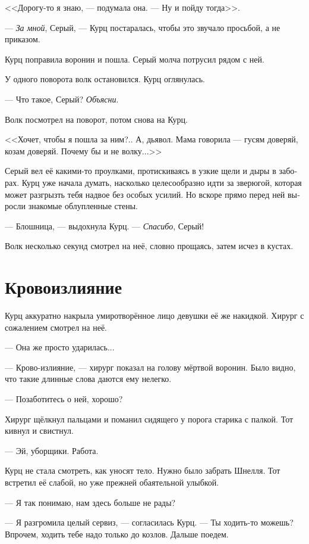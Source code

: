 \documentclass[a4paper,12pt,fleqn]{book}\usepackage{cooltooltips}\usepackage{polyglossia}\setdefaultlanguage[babelshorthands=true]{russian}\setotherlanguage{english}\defaultfontfeatures{Ligatures=TeX,Mapping=tex-text} \usepackage{xcolor}\definecolor{lightgray}{HTML}{bbbbbb}\color{lightgray}\newcommand{\ml}[3]{\textenglish{\textcolor{black}{#3}}}
\begin{document}
<<Дорогу-то я знаю, --- подумала она.
--- Ну и пойду тогда>>.

--- \textit{За мной}, Серый, --- Курц постаралась, чтобы это звучало просьбой, а не приказом.

Курц поправила воронин и пошла.
Серый молча потрусил рядом с ней.

У одного поворота волк остановился.
Курц оглянулась.

--- Что такое, Серый?
\textit{Объясни}.

Волк посмотрел на поворот, потом снова на Курц.

<<Хочет, чтобы я пошла за ним?..
А, дьявол.
Мама говорила --- гусям доверяй, козам доверяй.
Почему бы и не волку...>>

Серый вел её какими-то проулками, протискиваясь в узкие щели и дыры в заборах.
Курц уже начала думать, насколько целесообразно идти за зверюгой, которая может разгрызть тебя надвое без особых усилий.
Но вскоре прямо перед ней выросли знакомые облупленные стены.

--- Блошница, --- выдохнула Курц.
--- \textit{Спасибо}, Серый!

Волк несколько секунд смотрел на неё, словно прощаясь, затем исчез в кустах.

\section{Кровоизлияние}

Курц аккуратно накрыла умиротворённое лицо девушки её же накидкой.
Хирург с сожалением смотрел на неё.

--- Она же просто ударилась...

--- Крово-излияние, --- хирург показал на голову мёртвой воронин.
Было видно, что такие длинные слова даются ему нелегко.

--- Позаботитесь о ней, хорошо?

Хирург щёлкнул пальцами и поманил сидящего у порога старика с палкой.
Тот кивнул и свистнул.

--- Эй, уборщики.
Работа.

Курц не стала смотреть, как уносят тело.
Нужно было забрать Шнелля.
Тот встретил её слабой, но уже прежней обаятельной улыбкой.

--- Я так понимаю, нам здесь больше не рады?

--- Я разгромила целый сервиз, --- согласилась Курц.
--- Ты ходить-то можешь?
Впрочем, ходить тебе надо только до козлов.
Дальше поедем.
\end{document}
